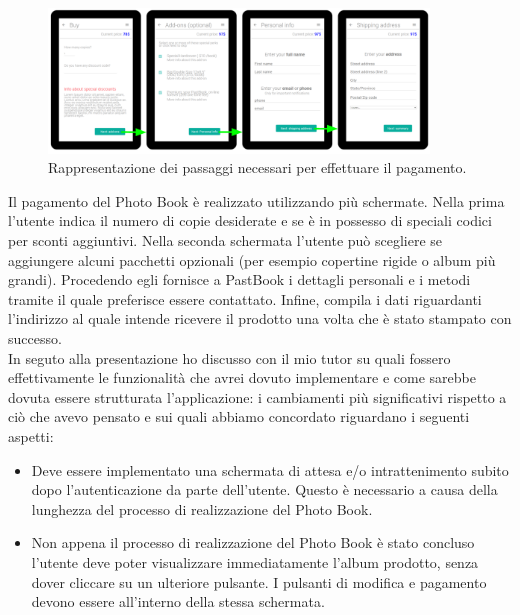 				\begin{figure}[H]
					\centering
					\includegraphics[width=0.9\textwidth]{capitolo_3/immagini/wireframe_4.png}
					\caption{Rappresentazione dei passaggi necessari per effettuare il pagamento.}
				\end{figure}
				\noindent Il pagamento del Photo Book è realizzato utilizzando più schermate. Nella prima l'utente indica il numero
				di copie desiderate e se è in possesso di speciali codici per sconti aggiuntivi. Nella seconda schermata l'utente può
				scegliere se aggiungere alcuni pacchetti opzionali (per esempio copertine rigide o album più grandi). Procedendo egli
				fornisce a PastBook i dettagli personali e i metodi tramite il quale preferisce essere contattato. Infine, compila
				i dati riguardanti l'indirizzo al quale intende ricevere il prodotto una volta che è stato stampato con successo.\\
				In seguto alla presentazione ho discusso con il mio tutor su quali fossero effettivamente le funzionalità che avrei
				dovuto implementare e come sarebbe dovuta essere strutturata l'applicazione: i cambiamenti più significativi
				rispetto a ciò che avevo pensato e sui quali abbiamo concordato riguardano i seguenti aspetti:
				\begin{itemize}
					\item Deve essere implementato una schermata di attesa e/o intrattenimento subito dopo l'autenticazione da
					parte dell'utente. Questo è necessario a causa della lunghezza del processo di realizzazione del Photo Book.
					\item Non appena il processo di realizzazione del Photo Book è stato concluso l'utente deve poter
					visualizzare immediatamente l'album prodotto, senza dover cliccare su un ulteriore pulsante. I pulsanti di
					modifica e pagamento devono essere all'interno della stessa schermata.
				\end{itemize}
